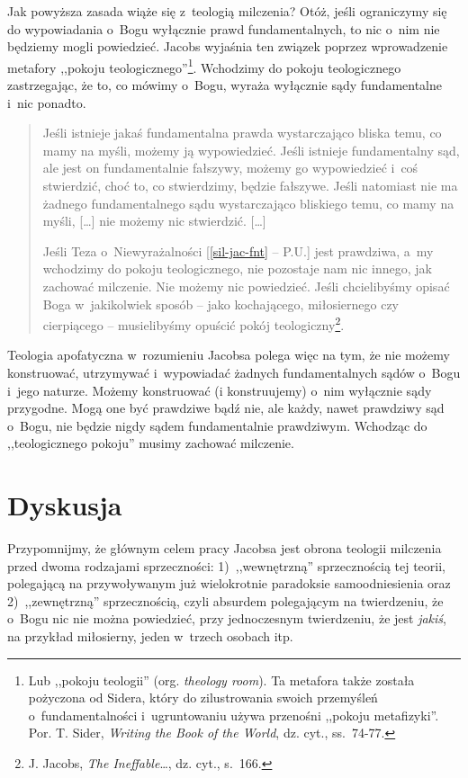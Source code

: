 Jak powyższa zasada wiąże się z~teologią milczenia? Otóż, jeśli ograniczymy się do wypowiadania o~Bogu wyłącznie prawd fundamentalnych, to nic o~nim nie będziemy mogli powiedzieć. Jacobs wyjaśnia ten związek poprzez wprowadzenie metafory ,,pokoju teologicznego''\footnote{Lub ,,pokoju teologii'' (org. \textit{theology room}). Ta metafora także została pożyczona od Sidera, który do zilustrowania swoich przemyśleń o~fundamentalności i~ugruntowaniu używa przenośni ,,pokoju metafizyki''. Por. T. Sider, \textit{Writing the Book of the World}, dz. cyt., ss.~74-77.}. Wchodzimy do pokoju teologicznego zastrzegając, że to, co mówimy o~Bogu, wyraża wyłącznie sądy fundamentalne i~nic ponadto.

\begin{quote}
Jeśli istnieje jakaś fundamentalna prawda wystarczająco bliska temu, co mamy na myśli, możemy ją wypowiedzieć. Jeśli istnieje fundamentalny sąd, ale jest on fundamentalnie fałszywy, możemy go wypowiedzieć i~coś stwierdzić, choć to, co stwierdzimy, będzie fałszywe. Jeśli natomiast nie ma żadnego fundamentalnego sądu wystarczająco bliskiego temu, co mamy na myśli, [\ldots] nie możemy nic stwierdzić. [\ldots]

Jeśli Teza o~Niewyrażalności [\ref{sil-jac-fnt} -- P.U.] jest prawdziwa, a~my wchodzimy do pokoju teologicznego, nie pozostaje nam nic innego, jak zachować milczenie. Nie możemy nic powiedzieć. Jeśli chcielibyśmy opisać Boga w~jakikolwiek sposób -- jako kochającego, miłosiernego czy cierpiącego -- musielibyśmy opuścić pokój teologiczny\footnote{J. Jacobs, \textit{The Ineffable}\ldots, dz. cyt., s.~166.}.
\end{quote}

Teologia apofatyczna w~rozumieniu Jacobsa polega więc na tym, że nie możemy konstruować, utrzymywać i~wypowiadać żadnych fundamentalnych sądów o~Bogu i~jego naturze. Możemy konstruować (i konstruujemy) o~nim wyłącznie sądy przygodne. Mogą one być prawdziwe bądź nie, ale każdy, nawet prawdziwy sąd o~Bogu, nie będzie nigdy sądem fundamentalnie prawdziwym. Wchodząc do ,,teologicznego pokoju'' musimy zachować milczenie.


\section{Dyskusja}

Przypomnijmy, że głównym celem pracy Jacobsa jest obrona teologii milczenia przed dwoma rodzajami sprzeczności: 1)~,,wewnętrzną'' sprzecznością tej teorii, polegającą na przywoływanym już wielokrotnie paradoksie samoodniesienia oraz 2)~,,zewnętrzną'' sprzecznością, czyli absurdem polegającym na twierdzeniu, że o~Bogu nic nie można powiedzieć, przy jednoczesnym twierdzeniu, że jest \textit{jakiś}, na przykład miłosierny, jeden w~trzech osobach itp.

